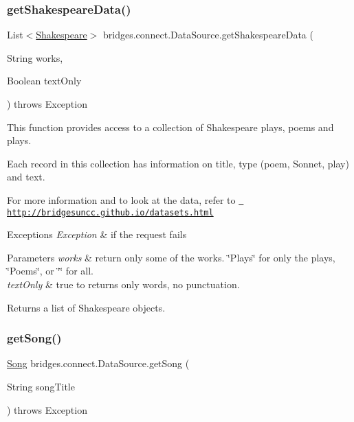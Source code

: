 \subsubsection{\texorpdfstring{getShakespeareData()}{getShakespeareData()}\hspace{0.1cm}{\footnotesize\ttfamily [3/3]}}
{\footnotesize\ttfamily List$<$\mbox{\hyperlink{classbridges_1_1data__src__dependent_1_1_shakespeare}{Shakespeare}}$>$ bridges.\+connect.\+Data\+Source.\+get\+Shakespeare\+Data (\begin{DoxyParamCaption}\item[{String}]{works,  }\item[{Boolean}]{text\+Only }\end{DoxyParamCaption}) throws Exception}



This function provides access to a collection of Shakespeare plays, poems and plays. 

Each record in this collection has information on title, type (poem, Sonnet, play) and text.

For more information and to look at the data, refer to \href{http://bridgesuncc.github.io/datasets.html}{\texttt{ http\+://bridgesuncc.\+github.\+io/datasets.\+html}}


\begin{DoxyExceptions}{Exceptions}
{\em Exception} & if the request fails\\
\hline
\end{DoxyExceptions}

\begin{DoxyParams}{Parameters}
{\em works} & return only some of the works. \char`\"{}\+Plays\char`\"{} for only the plays, \char`\"{}\+Poems\char`\"{}, or \char`\"{}\char`\"{} for all.\\
\hline
{\em text\+Only} & true to returns only words, no punctuation.\\
\hline
\end{DoxyParams}
\begin{DoxyReturn}{Returns}
a list of Shakespeare objects. 
\end{DoxyReturn}
\mbox{\label{classbridges_1_1connect_1_1_data_source_a4f49b088703c74d68bd854d40edc5ad4}} 
\subsubsection{\texorpdfstring{getSong()}{getSong()}\hspace{0.1cm}{\footnotesize\ttfamily [1/2]}}
{\footnotesize\ttfamily \mbox{\hyperlink{classbridges_1_1data__src__dependent_1_1_song}{Song}} bridges.\+connect.\+Data\+Source.\+get\+Song (\begin{DoxyParamCaption}\item[{String}]{song\+Title }\end{DoxyParamCaption}) throws Exception}

